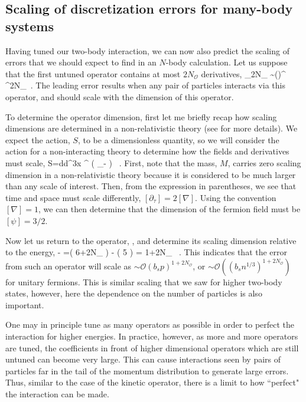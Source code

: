 \subsection{Scaling of discretization errors for many-body systems}
Having tuned our two-body interaction, we can now also predict the scaling of errors that we should expect to find in an $N$-body calculation. Let us suppose that the first untuned operator contains at most $2N_{{\mathcal{ O}}}$ derivatives,
\beq
\label{eq:errop}
{}_{2N_{{}}} \sim \left(\psi\psi\right)^{\dagger} \psi \nabla^{2N_{{}}}\psi \ .
\eeq
The leading error results when any pair of particles interacts via this operator, and should scale with the dimension of this operator. 

To determine the operator dimension, first let me briefly recap how scaling dimensions are determined in a non-relativistic theory (see \cite{Kaplan:2005es} for more details). We expect the action, $S$, to be a dimensionless quantity, so we will consider the action for a non-interacting theory to determine how the fields and derivatives must scale,
\beq
S=\int d\tau d^3x \psi^{\dagger} \left( \partial_{\tau}- \right) \psi \ .
\eeq
First, note that the mass, $M$, carries zero scaling dimension in a non-relativistic theory because it is considered to be much larger than any scale of interest. Then, from the expression in parentheses, we see that time and space must scale differently, $[\partial_{\tau}] = 2 [\nabla]$. Using the convention $[\nabla]=1$, we can then determine that the dimension of the fermion field must be $[\psi]=3/2$. 

Now let us return to the operator, , and determine its scaling dimension relative to the energy,
\beq
{} - \left[\psi^{\dagger} \partial_{\tau} \psi \right] =( 6+2N_{{}} ) - ( 5 ) = 1+2N_{{}} \ .
\eeq
This indicates that the error from such an operator will scale as $\sim {\mathcal{ O}}(b_s p)^{1+2N_{{\mathcal{ O}}}}$, or $\sim {\mathcal{ O}}\left((b_s n^{1/3})^{1+2N_{{\mathcal{ O}}}}\right)$ for unitary fermions. This is similar scaling that we saw for higher two-body states, however, here the dependence on the number of particles is also important.

One may in principle tune as many operators as possible in order to perfect the interaction for higher energies. In practice, however, as more and more operators are tuned, the coefficients in front of higher dimensional operators which are still untuned can become very large. This can cause interactions seen by pairs of particles far in the tail of the momentum distribution to generate large errors. Thus, similar to the case of the kinetic operator, there is a limit to how ``perfect" the interaction can be made. 

